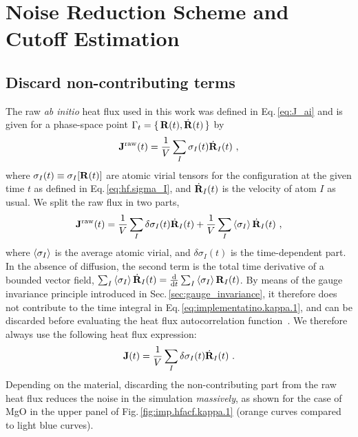 \section{Noise Reduction Scheme and Cutoff Estimation}
\subsection{Discard non-contributing terms}
The raw \emph{ab initio} heat flux used in this work was defined in Eq.\,\eqref{eq:J_ai} and is given for a phase-space point $\Gamma_t = \set{{\bf R} (t), \dot{\bf R} (t)}$ by
\begin{align}
	{\bf J}^{\rm raw} (t) 
		= \frac{1}{V} \sum_I \sigma_I (t)  \dot{\bf R}_I (t)~,
	\label{eq:imp.J.0}
\end{align}
where $\sigma_I (t) \equiv \sigma_I [{\bf R} (t)]$ are atomic virial tensors for the configuration at the given time $t$ as defined in Eq.\,\eqref{eq:hf.sigma_I}, and $\dot{\bf R}_I (t)$ is the velocity of atom $I$ as usual. We split the raw flux in two parts,
\begin{align}
	{\bf J}^{\rm raw} (t)
		= \frac{1}{V} \sum_I \delta \sigma_I (t) \dot{\bf R}_I (t) 
		+ \frac{1}{V} \sum_I \braket{\sigma_I} \dot{\bf R}_I (t)~,
	\label{eq:imp.J.1}
\end{align}
where $\braket{\sigma_I}$ is the average atomic virial, and $\delta \sigma_I (t)$ is the time-dependent part. In the absence of diffusion, the second term is the total time derivative of a bounded vector field, $\sum_I \braket{\sigma_I} \dot{\bf R}_I (t) = \frac{{\rm d}}{{\rm d} t} \sum_I \braket{\sigma_I} {\bf R}_I (t)$. By means of the gauge invariance principle introduced in Sec.\,\ref{sec:gauge_invariance}, it therefore does not contribute to the time integral in Eq.\,\eqref{eq:implementatino.kappa.1}, and can be discarded before evaluating the heat flux autocorrelation function~\cite{Ercole2016}. We therefore always use the following heat flux expression:
\begin{align}
	{\bf J} (t)
		= \frac{1}{V} \sum_I \delta \sigma_I (t) \dot{\bf R}_I (t)~.
	\label{eq:imp.J}
\end{align}
Depending on the material, discarding the non-contributing part from the raw heat flux reduces the noise in the simulation \emph{massively}, as shown for the case of MgO in the upper panel of Fig.\,\ref{fig:imp.hfacf.kappa.1} (orange curves compared to light blue curves).
